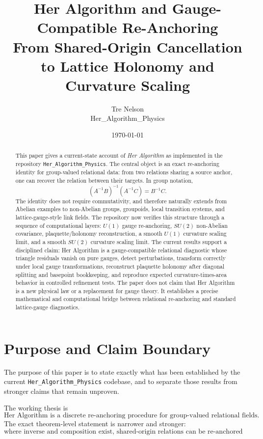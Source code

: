 \documentclass[11pt]{article}
\title{\textbf{Her Algorithm and Gauge-Compatible Re-Anchoring}\\
\large From Shared-Origin Cancellation to Lattice Holonomy and Curvature Scaling}
\author{Tre Nelson\\\small Her\_Algorithm\_Physics}
\date{\today}
\newcommand{\HA}{Her Algorithm}
\newcommand{\Uone}{U(1)}
\newcommand{\Sutwo}{SU(2)}
\begin{document}
\maketitle

\begin{abstract}
This paper gives a current-state account of \emph{Her Algorithm} as implemented in the repository \texttt{Her\_Algorithm\_Physics}.  The central object is an exact re-anchoring identity for group-valued relational data: from two relations sharing a source anchor, one can recover the relation between their targets.  In group notation,
\[
(A^{-1}B)^{-1}(A^{-1}C)=B^{-1}C.
\]
The identity does not require commutativity, and therefore naturally extends from Abelian examples to non-Abelian groups, groupoids, local transition systems, and lattice-gauge-style link fields.  The repository now verifies this structure through a sequence of computational layers: \(\Uone\) gauge re-anchoring, \(\Sutwo\) non-Abelian covariance, plaquette/holonomy reconstruction, a smooth \(\Uone\) curvature scaling limit, and a smooth \(\Sutwo\) curvature scaling limit.  The current results support a disciplined claim: \HA{} is a gauge-compatible relational diagnostic whose triangle residuals vanish on pure gauges, detect perturbations, transform correctly under local gauge transformations, reconstruct plaquette holonomy after diagonal splitting and basepoint bookkeeping, and reproduce expected curvature-times-area behavior in controlled refinement tests.  The paper does not claim that \HA{} is a new physical law or a replacement for gauge theory.  It establishes a precise mathematical and computational bridge between relational re-anchoring and standard lattice-gauge diagnostics.
\end{abstract}

\tableofcontents

\section{Purpose and Claim Boundary}

The purpose of this paper is to state exactly what has been established by the current \texttt{Her\_Algorithm\_Physics} codebase, and to separate those results from stronger claims that remain unproven.

The working thesis is
\[
\boxed{\text{\HA{} is a discrete re-anchoring procedure for group-valued relational fields.}}
\]
The exact theorem-level statement is narrower and stronger:
\[
\boxed{\text{where inverse and composition exist, shared-origin relations can be re-anchored exactly.}}
\]
\end{document}
